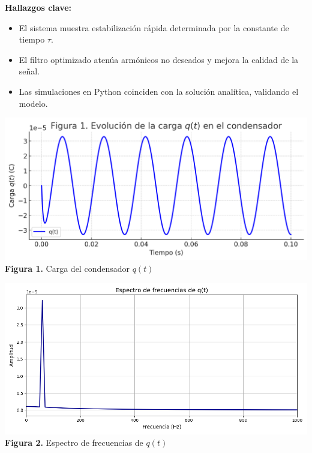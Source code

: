 \documentclass[12pt]{article}
\begin{document}
\begin{tcbposter}
{        \vspace{10mm}

        \textbf{Hallazgos clave:}
        \begin{itemize}
            \item El sistema muestra estabilización rápida determinada por la constante de tiempo \( \tau \).
            \item El filtro optimizado atenúa armónicos no deseados y mejora la calidad de la señal.
            \item Las simulaciones en Python coinciden con la solución analítica, validando el modelo.
        \end{itemize}

        \vspace{10mm}

        \begin{minipage}[t]{0.49\textwidth}
            \centering
            \includegraphics[width=\linewidth]{img/7.png}\\
            \textbf{Figura 1.} Carga del condensador \( q(t) \)
        \end{minipage}
        \hfill
        \begin{minipage}[t]{0.49\textwidth}
            \centering
            \includegraphics[width=\linewidth]{img/8.png}\\
            \textbf{Figura 2.} Espectro de frecuencias de \( q(t) \)
        \end{minipage}
    }



\end{tcbposter}
\end{document}
